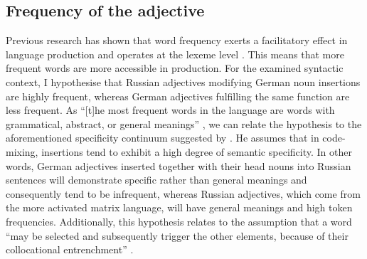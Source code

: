\subsection{Frequency of the adjective}\label{section_fr_adj}
Previous research has shown that word frequency exerts a facilitatory effect in language production \citep{oldfield-wingfield} and operates at the lexeme level \citep{jeschiniak-levelt}. This means that more frequent words are more accessible in production. For the examined syntactic context, I hypothesise that Russian adjectives modifying German noun insertions are highly frequent, whereas German adjectives fulfilling the same function are less frequent. As ``[t]he most frequent words in the language are words with grammatical, abstract, or general meanings'' \citep[][88]{richards-1970}, we can relate the hypothesis to the aforementioned specificity continuum suggested by \citet{backus-two-1996, backus-2001}. He assumes that in code-mixing, insertions tend to exhibit a high degree of semantic specificity. In other words, German adjectives inserted together with their head nouns into Russian sentences will demonstrate specific rather than general meanings and consequently tend to be infrequent, whereas Russian adjectives, which come from the more activated matrix language, will have general meanings and high token frequencies. Additionally, this hypothesis relates to the assumption that a word ``may be selected and subsequently trigger the other elements, because of their collocational entrenchment'' \citep[126]{backus-two-1996}.

